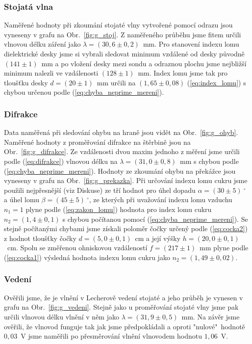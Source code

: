 \documentclass[english]{article}
\begin{document}
			\subsubsection{Stojatá vlna}
					Naměřené hodnoty při zkoumání stojaté vlny vytvořené pomocí odrazu jsou vyneseny v grafu na Obr.~\ref{fig:g_stoj}. Z naměřeného průběhu jsme fitem určili vlnovou délku záření jako $\lambda=(30,6\pm0,2)$~mm. Pro stanovení indexu lomu dielektrické desky jsme si vybrali sledovat minimum vzdálené od desky původně $(141\pm1)$~mm a po vložení desky mezi sondu a odraznou plochu jsme nejbližší minimum nalezli ve vzdálenosti $(128\pm1)$~mm. Index lomu jsme tak pro tloušťku desky $d=(20\pm1)$~mm určili na $(1,65\pm0,08)$ (\ref{eq:index_lomu}) s chybou určenou podle (\ref{eq:chyba_neprime_mereni}).
			\subsubsection{Difrakce}
					Data naměřená při sledování ohybu na hraně jsou vidět na Obr.~\ref{fig:g_ohyb}. Naměřené hodnoty z proměřování difrakce na štěrbině jsou na Obr.~\ref{fig:g_difrakce}. Ze vzdálenosti dvou maxim jednoho z měření jsme určili podle (\ref{eq:difrakce}) vlnovou délku na $\lambda=(31,0\pm0,8)$~mm s chybou podle (\ref{eq:chyba_neprime_mereni}). Hodnoty ze zkoumání ohybu na překážce jsou vyneseny v grafu na Obr.~\ref{fig:g_prekazka}. Při určování indexu lomu cukru jsme použili nejpřesnější (viz Diskuse) ze tří hodnot pro úhel dopadu $\alpha=(30\pm5)~^\circ$ a úhel lomu $\beta=(45\pm5)~^\circ$, ze kterých při uvažování indexu lomu vzduchu $n_1=1$ plyne podle (\ref{eq:zakon_lomu}) hodnota pro index lomu cukru $n_2=(1,4\pm0,1)$ s chybou počítanou pomocí (\ref{eq:chyba_neprime_mereni}). Se stejně počítanými chybami jsme získali poloměr čočky určený podle (\ref{eq:cocka2}) z hodnot tloušťky čočky $d=(5,0\pm0,1)$~cm a její výšky $h=(20,0\pm0,1)$~cm. Spolu se změřenou ohniskovou vzdáleností $f=(217\pm1)$~mm plyne podle (\ref{eq:cocka1}) výsledná hodnota indexu lomu cukru jako $n_2=(1,49\pm0,02)$.
			\subsubsection{Vedení}
					Ověřili jsme, že je vlnění v Lecherově vedení stojaté a jeho průběh je vynesen v grafu na Obr.~\ref{fig:g_vedeni}. Stejně jako u proměřování stojaté vlny jsme pak určili vlnovou délku vlnění v něm jako $\lambda=(31,9\pm0,5)$~mm. Na závěr jsme ověřili, že vlnovod funguje tak jak jsme předpokládali a oproti "nulové"~hodnotě $0,03$~V jsme naměřili po přesměrování vlnění vlnovodem hodnotu $1,06$~V.
			
\end{document}
